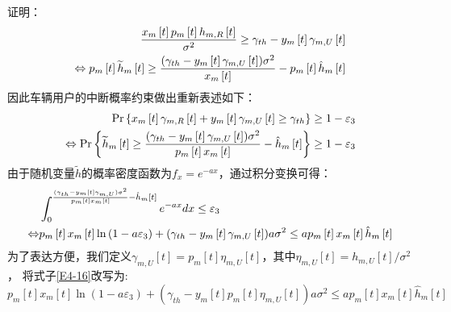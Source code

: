 证明：
\begin{align} \label{E4-14}
\frac{x_m\left[t\right]p_m\left[t\right]h_{m,R}\left[t\right]}{\sigma^2}\geq \gamma_{th}-y_m\left[t\right]\gamma_{m,U}\left[t\right] \\
\Leftrightarrow
p_m\left[t\right]{\widetilde{h}}_{m}\left[t\right]\geq \frac{{(\gamma_{th}-y_m\left[t\right]\gamma_{m,U}\left[t\right])\sigma^2}}{x_m\left[t\right]}
-p_m\left[t\right]{\hat{h}}_{m}\left[t\right]   \notag
\end{align}
因此车辆用户的中断概率约束做出重新表述如下：
\begin{align} \label{E4-15}
\Pr\left\{x_m\left[t\right]\gamma_{m,R}\left[t\right]+y_m\left[t\right]\gamma_{m,U}\left[t\right] \geq \gamma_{th}\right\}\geq1-\varepsilon_3    \\
\Leftrightarrow
\Pr\left\{{\widetilde{h}}_{m}\left[t\right]\geq \frac{{(\gamma_{th}-y_m\left[t\right]\gamma_{m,U}\left[t\right])\sigma^2}}{p_m\left[t\right]x_m\left[t\right]}
-{\hat{h}}_{m}\left[t\right]\right\}\geq1-\varepsilon_3                          \notag
\end{align}
由于随机变量$\widetilde{h}$的概率密度函数为$f_x={{e}^{-ax}}$，通过积分变换可得：
\begin{align} \label{E4-16}
&\int_{0}^{\frac{{(\gamma_{th}-y_m\left[t\right]\gamma_{m,U})\sigma^2}}{p_m\left[t\right]x_m\left[t\right]}
-{\hat{h}}_{m}\left[t\right]}{e^{-ax}dx}\le \varepsilon_3 \\
\Leftrightarrow
&p_m\left[t\right]x_m\left[t\right]\ln \left(1-a \varepsilon_3\right)+(\gamma_{th}-y_m\left[t\right]\gamma_{m,U}\left[t\right]) a \sigma^2
\leq a p_m\left[t\right]x_m\left[t\right]\hat{h}_{m}\left[t\right]   \notag
\end{align}
为了表达方便，我们定义$\gamma_{m,U}\left[t\right]=p_m\left[t\right]\eta_{m,U}\left[t\right]$，其中$\eta_{m,U}\left[t\right]=h_{m,U}\left[t\right]/{\sigma^2}$，
将式子\eqref{E4-16}改写为:
\begin{equation} \label{E4-17}
p_m\left[t\right]x_m\left[t\right]\ln \left(1-a \varepsilon_3\right)+(\gamma_{th}-y_m\left[t\right]p_m\left[t\right]\eta_{m,U}\left[t\right]) a \sigma^2
\leq a p_m\left[t\right]x_m\left[t\right]\hat{h}_{m}\left[t\right]
\end{equation}

